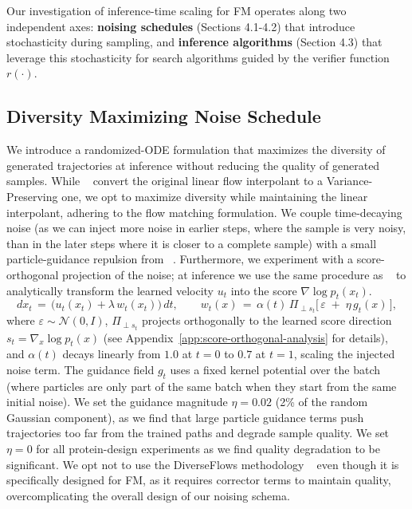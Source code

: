 \documentclass{article} %
\begin{document}
Our investigation of inference-time scaling for FM operates along two independent axes: \textbf{noising schedules} (Sections 4.1-4.2) that introduce stochasticity during sampling, and \textbf{inference algorithms} (Section 4.3) that leverage this stochasticity for search algorithms guided by the verifier function \( r(\cdot) \).

\subsection{Diversity Maximizing Noise Schedule}
\label{sec:custom-rand-ode}
We introduce a randomized-ODE formulation that maximizes the diversity of generated trajectories at inference without reducing the quality of generated samples. While ~\cite{kim2025flowits} convert the original linear flow interpolant to a Variance-Preserving one, we opt to maximize diversity while maintaining the linear interpolant, adhering to the flow matching formulation. We couple time-decaying noise (as we can inject more noise in earlier steps, where the sample is very noisy, than in the later steps where it is closer to a complete sample) with a small particle-guidance repulsion from ~\cite{corso2023particleguidancenoniiddiverse}. Furthermore, we experiment with a score-orthogonal projection of the noise; at inference we use the same procedure as ~\cite{kim2025flowits} to analytically transform the learned velocity \( u_t \) into the score \( \nabla \log p_t(x_t) \). 
\[
dx_t \,=\, \big(u_t(x_t) + \lambda\,w_t(x_t)\big)\,dt,\qquad
w_t(x) \,=\, \alpha(t)\,\Pi_{\perp s_t}\Big[\,\varepsilon\; +\; \eta\,g_t(x)\,\Big],
\]
where $\varepsilon\!\sim\!\mathcal{N}(0,I)$, $\Pi_{\perp s_t}$ projects orthogonally to the learned score direction $s_t = \nabla_x \log p_t(x)$ (see Appendix~\ref{app:score-orthogonal-analysis} for details), and $\alpha(t)$ decays linearly from $1.0$ at $t{=}0$ to $0.7$ at $t{=}1$, scaling the injected noise term. The guidance field $g_t$ uses a fixed kernel potential over the batch (where particles are only part of the same batch when they start from the same initial noise). We set the guidance magnitude $\eta = 0.02$ (2\% of the random Gaussian component), as we find that large particle guidance terms push trajectories too far from the trained paths and degrade sample quality. We set $\eta = 0$ for all protein-design experiments as we find quality degradation to be significant. We opt not to use the DiverseFlows methodology ~\cite{morshed2025diverseflowsampleefficientdiversemode} even though it is specifically designed for FM, as it requires corrector terms to maintain quality, overcomplicating the overall design of our noising schema.
\end{document}
